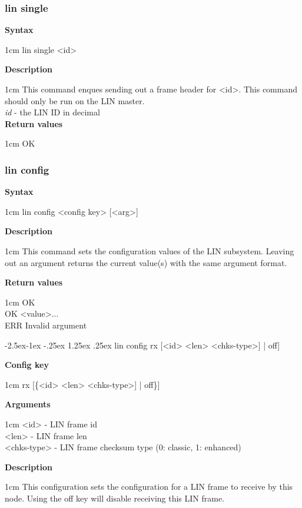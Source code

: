 \documentclass{article}[a4paper]
\makeatletter
\newcommand\subsubsubsection{\@startsection{paragraph}{4}{\z@}%
            {-2.5ex\@plus -1ex \@minus -.25ex}%
            {1.25ex \@plus .25ex}%
            {\normalfont\normalsize\bfseries}}
\makeatother
\begin{document}
\subsubsection{lin single}
\begin{tcolorbox}
	{\bf Syntax}

	 1cm \dimexpr\linewidth-2cm\relax
	lin single <id>

	\medskip
	{\bf Description}

	 1cm \dimexpr\linewidth-2cm\relax
	This command enques sending out a frame header for <id>. This command should
	only be run on the LIN master.
	\medskip \\
	{\it id} - the LIN ID in decimal \\

	\medskip
	{\bf Return values}

	 1cm \dimexpr\linewidth-2cm\relax
	OK
\end{tcolorbox}

\subsubsection{lin config}
\begin{tcolorbox}
	{\bf Syntax}

	 1cm \dimexpr\linewidth-2cm\relax
	lin config <config key> [<arg>]

	\medskip
	{\bf Description}

	 1cm \dimexpr\linewidth-2cm\relax
	This command sets the configuration values of the LIN subsystem.
	Leaving out an argument returns the current value(s) with the same argument
	format.

	\medskip
	{\bf Return values}

	 1cm \dimexpr\linewidth-2cm\relax
	OK \\
	OK <value>... \\
	ERR Invalid argument
\end{tcolorbox}

\subsubsubsection{lin config rx [<id> <len> <chks-type>] | off]}
\begin{tcolorbox}
	{\bf Config key}

	 1cm \dimexpr\linewidth-2cm\relax
	rx [\{<id> <len> <chks-type>] | off\}]

	\medskip
	{\bf Arguments}

	 1cm \dimexpr\linewidth-2cm\relax
	<id> - LIN frame id \\
	<len> - LIN frame len \\
	<chks-type> - LIN frame checksum type (0: classic, 1: enhanced)

	\medskip
	{\bf Description}

	 1cm \dimexpr\linewidth-2cm\relax
	This configuration sets the configuration for a LIN frame to receive by this
	node. Using the off key will disable receiving this LIN frame.
\end{tcolorbox}
\end{document}
